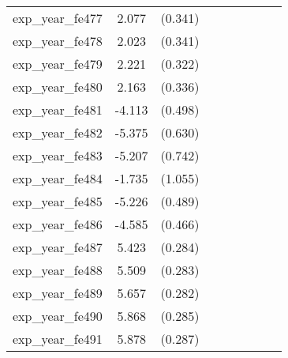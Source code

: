{\begin{tabular}{l*{4}{cc}}
exp\_year\_fe477&    2.077\sym{***}&  (0.341)&                  &         &                  &         &                  &         \\
exp\_year\_fe478&    2.023\sym{***}&  (0.341)&                  &         &                  &         &                  &         \\
exp\_year\_fe479&    2.221\sym{***}&  (0.322)&                  &         &                  &         &                  &         \\
exp\_year\_fe480&    2.163\sym{***}&  (0.336)&                  &         &                  &         &                  &         \\
exp\_year\_fe481&   -4.113\sym{***}&  (0.498)&                  &         &                  &         &                  &         \\
exp\_year\_fe482&   -5.375\sym{***}&  (0.630)&                  &         &                  &         &                  &         \\
exp\_year\_fe483&   -5.207\sym{***}&  (0.742)&                  &         &                  &         &                  &         \\
exp\_year\_fe484&   -1.735         &  (1.055)&                  &         &                  &         &                  &         \\
exp\_year\_fe485&   -5.226\sym{***}&  (0.489)&                  &         &                  &         &                  &         \\
exp\_year\_fe486&   -4.585\sym{***}&  (0.466)&                  &         &                  &         &                  &         \\
exp\_year\_fe487&    5.423\sym{***}&  (0.284)&                  &         &                  &         &                  &         \\
exp\_year\_fe488&    5.509\sym{***}&  (0.283)&                  &         &                  &         &                  &         \\
exp\_year\_fe489&    5.657\sym{***}&  (0.282)&                  &         &                  &         &                  &         \\
exp\_year\_fe490&    5.868\sym{***}&  (0.285)&                  &         &                  &         &                  &         \\
exp\_year\_fe491&    5.878\sym{***}&  (0.287)&                  &         &                  &         &                  &         \\

\end{tabular}}
